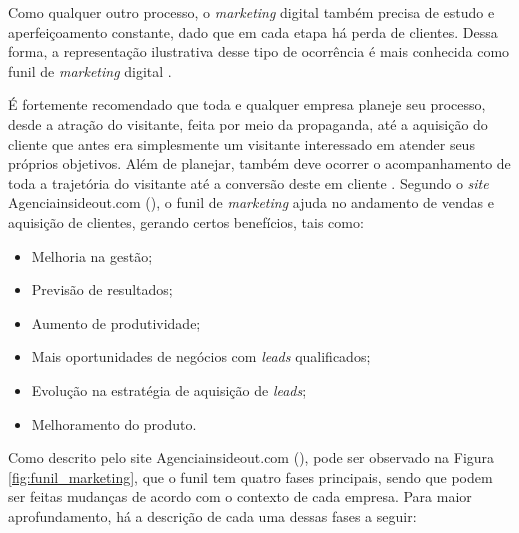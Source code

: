 Como qualquer outro processo, o \textit{marketing} digital também precisa de estudo e aperfeiçoamento constante, dado que em cada etapa há perda de clientes. Dessa forma, a representação ilustrativa desse tipo de ocorrência é mais conhecida como funil de \textit{marketing} digital \cite{BORGES:2017}.

É fortemente recomendado que toda e qualquer empresa planeje seu processo, desde a atração do visitante, feita por meio da propaganda, até a aquisição do cliente que antes era simplesmente um visitante interessado em atender seus próprios objetivos. Além de planejar, também deve ocorrer o acompanhamento de toda a trajetória do visitante até a conversão deste em cliente \cite{INSIDEOUT:2018}.
Segundo o \textit{site} Agenciainsideout.com (\citeyear{INSIDEOUT:2018}), o funil de \textit{marketing} ajuda no andamento de vendas e aquisição de clientes, gerando certos benefícios, tais como:

\begin{itemize}
    \item Melhoria na gestão;
    
    \item Previsão de resultados;
    
    \item Aumento de produtividade;
    
    \item Mais oportunidades de negócios com \textit{leads} qualificados;
    
    \item Evolução na estratégia de aquisição de \textit{leads};
    
    \item Melhoramento do produto.

\end{itemize}

Como descrito pelo site Agenciainsideout.com (\citeyear{INSIDEOUT:2018}), pode ser observado na Figura \ref{fig:funil_marketing}, que o funil tem quatro fases principais, sendo que podem ser feitas mudanças de acordo com o contexto de cada empresa. Para maior aprofundamento, há a descrição de cada uma dessas fases a seguir:

